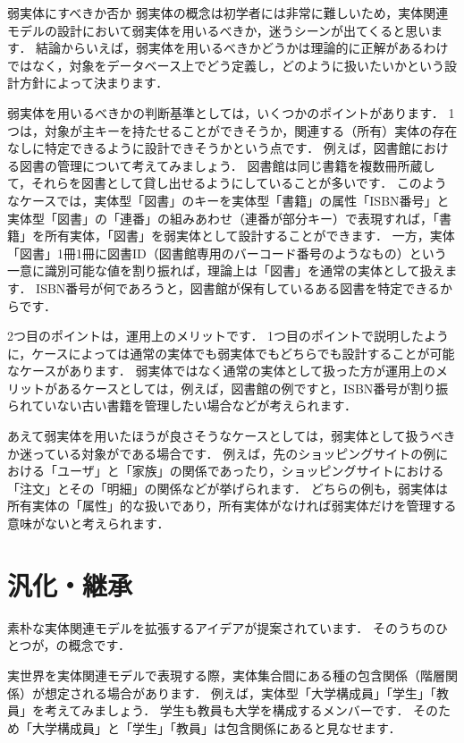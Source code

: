 \begin{tipbox}{弱実体にすべきか否か}
弱実体の概念は初学者には非常に難しいため，実体関連モデルの設計において弱実体を用いるべきか，迷うシーンが出てくると思います．
結論からいえば，弱実体を用いるべきかどうかは理論的に正解があるわけではなく，対象をデータベース上でどう定義し，どのように扱いたいかという設計方針によって決まります．

弱実体を用いるべきかの判断基準としては，いくつかのポイントがあります．
1つは，対象が主キーを持たせることができそうか，関連する（所有）実体の存在なしに特定できるように設計できそうかという点です．
例えば，図書館における図書の管理について考えてみましょう．
図書館は同じ書籍を複数冊所蔵して，それらを図書として貸し出せるようにしていることが多いです．
このようなケースでは，実体型「図書」のキーを実体型「書籍」の属性「ISBN番号」と実体型「図書」の「連番」の組みあわせ（連番が部分キー）で表現すれば，「書籍」を所有実体，「図書」を弱実体として設計することができます．
一方，実体「図書」1冊1冊に図書ID（図書館専用のバーコード番号のようなもの）という一意に識別可能な値を割り振れば，理論上は「図書」を通常の実体として扱えます．
ISBN番号が何であろうと，図書館が保有しているある図書を特定できるからです．

2つ目のポイントは，運用上のメリットです．
1つ目のポイントで説明したように，ケースによっては通常の実体でも弱実体でもどちらでも設計することが可能なケースがあります．
弱実体ではなく通常の実体として扱った方が運用上のメリットがあるケースとしては，例えば，図書館の例ですと，ISBN番号が割り振られていない古い書籍を管理したい場合などが考えられます．

あえて弱実体を用いたほうが良さそうなケースとしては，弱実体として扱うべきか迷っている対象がである場合です．
例えば，先のショッピングサイトの例における「ユーザ」と「家族」の関係であったり，ショッピングサイトにおける「注文」とその「明細」の関係などが挙げられます．
どちらの例も，弱実体は所有実体の「属性」的な扱いであり，所有実体がなければ弱実体だけを管理する意味がないと考えられます．
\end{tipbox}


\section{汎化・継承}\label{sec:inheritance}
素朴な実体関連モデルを拡張するアイデアが提案されています．
そのうちのひとつが，の概念です\cite{Smith1977}．

実世界を実体関連モデルで表現する際，実体集合間にある種の包含関係（階層関係）が想定される場合があります．
例えば，実体型「大学構成員」「学生」「教員」を考えてみましょう．
学生も教員も大学を構成するメンバーです．
そのため「大学構成員」と「学生」「教員」は包含関係にあると見なせます．

